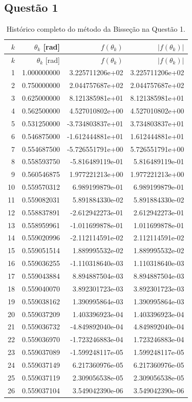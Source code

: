 \subsection*{Questão 1}
\begin{longtable}{rrrr}
\caption{Histórico completo do método da Bisseção na Questão 1.}\label{tab:iter-q1-1} \\
\toprule
$k$ & $\theta_k$ [rad] & $f(\theta_k)$ & $|f(\theta_k)|$ \\
\midrule
\endfirsthead
\toprule
$k$ & $\theta_k$ [rad] & $f(\theta_k)$ & $|f(\theta_k)|$ \\
\midrule
\endhead
1 & 1.000000000 & 3.225711206e+02 & 3.225711206e+02 \\
2 & 0.750000000 & 2.044757687e+02 & 2.044757687e+02 \\
3 & 0.625000000 & 8.121385981e+01 & 8.121385981e+01 \\
4 & 0.562500000 & 4.527010802e+00 & 4.527010802e+00 \\
5 & 0.531250000 & -3.734803837e+01 & 3.734803837e+01 \\
6 & 0.546875000 & -1.612444881e+01 & 1.612444881e+01 \\
7 & 0.554687500 & -5.726551791e+00 & 5.726551791e+00 \\
8 & 0.558593750 & -5.816489119e-01 & 5.816489119e-01 \\
9 & 0.560546875 & 1.977221213e+00 & 1.977221213e+00 \\
10 & 0.559570312 & 6.989199879e-01 & 6.989199879e-01 \\
11 & 0.559082031 & 5.891884330e-02 & 5.891884330e-02 \\
12 & 0.558837891 & -2.612942273e-01 & 2.612942273e-01 \\
13 & 0.558959961 & -1.011699878e-01 & 1.011699878e-01 \\
14 & 0.559020996 & -2.112114591e-02 & 2.112114591e-02 \\
15 & 0.559051514 & 1.889995532e-02 & 1.889995532e-02 \\
16 & 0.559036255 & -1.110318640e-03 & 1.110318640e-03 \\
17 & 0.559043884 & 8.894887504e-03 & 8.894887504e-03 \\
18 & 0.559040070 & 3.892301723e-03 & 3.892301723e-03 \\
19 & 0.559038162 & 1.390995864e-03 & 1.390995864e-03 \\
20 & 0.559037209 & 1.403396923e-04 & 1.403396923e-04 \\
21 & 0.559036732 & -4.849892040e-04 & 4.849892040e-04 \\
22 & 0.559036970 & -1.723246883e-04 & 1.723246883e-04 \\
23 & 0.559037089 & -1.599248117e-05 & 1.599248117e-05 \\
24 & 0.559037149 & 6.217360976e-05 & 6.217360976e-05 \\
25 & 0.559037119 & 2.309056538e-05 & 2.309056538e-05 \\
26 & 0.559037104 & 3.549042390e-06 & 3.549042390e-06 \\
\bottomrule
\end{longtable}

